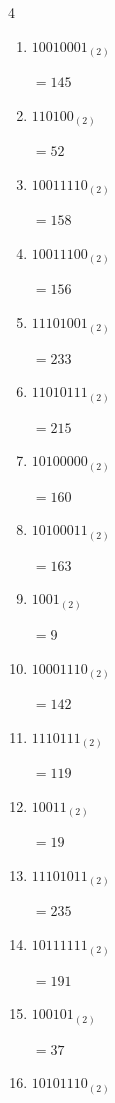 \begin{multicols}{4}
\begin{enumerate}
        $=233$

  \item $10010001_{(2)}$

        $=145$

  \item $110100_{(2)}$

        $=52$

  \item $10011110_{(2)}$

        $=158$

  \item $10011100_{(2)}$

        $=156$

\columnbreak %

  \item $11101001_{(2)}$

        $=233$

  \item $11010111_{(2)}$

        $=215$

  \item $10100000_{(2)}$

        $=160$

  \item $10100011_{(2)}$

        $=163$

  \item $1001_{(2)}$

        $=9$

  \item $10001110_{(2)}$

        $=142$

  \item $1110111_{(2)}$

        $=119$

  \item $10011_{(2)}$

        $=19$

  \item $11101011_{(2)}$

        $=235$

  \item $10111111_{(2)}$

        $=191$

  \item $100101_{(2)}$

        $=37$

  \item $10101110_{(2)}$


\end{enumerate}
\end{multicols}
